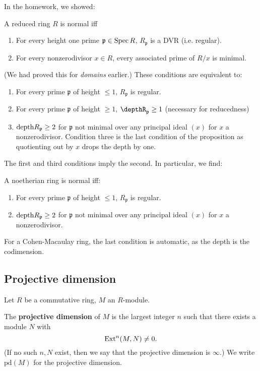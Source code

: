 In the homework, we showed:
\begin{proposition} 
A reduced ring $R$ is normal iff 
\begin{enumerate}
\item For every height one prime $\mathfrak{p}  \in \operatorname{Spec} R$,
$R_{\mathfrak{p}}$ is a DVR (i.e. regular).
\item For every nonzerodivisor $x \in R$, every associated prime
of $R/x$ is
minimal.
\end{enumerate}
\end{proposition} 
(We had proved this for \emph{domains} earlier.)
These conditions are equivalent to:
\begin{enumerate}
\item For every prime $\mathfrak{p}$ of height $\leq 1$,
$R_{\mathfrak{p}} $ is regular.
\item For every prime $\mathfrak{p}$ of height $\geq 1$, $\depthR_{\mathfrak{p}} \geq 1$ (necessary for reducedness)
\item $\mathrm{depth} R_{\mathfrak{p}} \geq 2$ for $\mathfrak{p}$ not
minimal over any
principal ideal $(x)$ for $x$ a nonzerodivisor. Condition three
is the last
condition of the proposition as quotienting out by $x$ drops the
depth by one.
\end{enumerate}

The first and third conditions imply the second. In particular,
we find:

\begin{theorem} A noetherian ring is normal
iff:
\begin{enumerate}
\item For every prime $\mathfrak{p}$ of height $\leq 1$,
$R_{\mathfrak{p}} $ is regular.
\item $\mathrm{depth} R_{\mathfrak{p}} \geq 2$ for $\mathfrak{p}$ not
minimal over any
principal ideal $(x)$ for $x$ a nonzerodivisor. \end{enumerate}
\end{theorem} 
For a Cohen-Macaulay ring, the last condition is automatic, as
the depth is the
codimension.

\subsection{Projective dimension}

\newcommand{\pr}{\mathrm{pd}}
Let $R$ be a commutative ring, $M$ an $R$-module. 

\begin{definition} 
The \textbf{projective dimension} of $M$ is the largest integer
$n$ such that
there exists  a module $N$ with
\[ \mathrm{Ext}^n(M,N) \neq 0.  \]
(If no such $n,N$ exist, then we say that the projective
dimension is $\infty$.)
We write $\pr(M)$ for the projective dimension.
\end{definition} 

